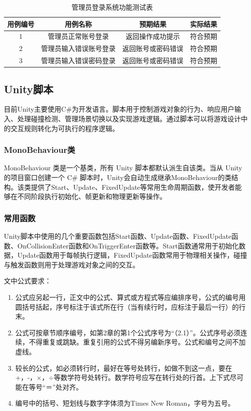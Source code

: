 \documentclass[12pt]{graduate-design-manual}
\begin{document}
\begin{table}[H]
\centering
\caption{管理员登录系统功能测试表}
\begin{tabular}{cccc}
\toprule
用例编号 & 用例名称 & 预期结果 & 实际结果 \\
\midrule
1 & 管理员正常账号登录 & 返回操作成功提示 & 符合预期 \\
2 & 管理员输入错误账号登录 & 返回账号或密码错误 & 符合预期 \\
3 & 管理员输入错误密码登录 & 返回账号或密码错误 & 符合预期 \\
\bottomrule
\end{tabular}
\end{table}

\subsection{Unity脚本}
目前Unity主要使用C\#为开发语言。脚本用于控制游戏对象的行为、响应用户输入、处理碰撞检测、管理场景切换以及实现游戏逻辑。通过脚本可以将游戏设计中的交互规则转化为可执行的程序逻辑。

\subsubsection{MonoBehaviour类}
MonoBehaviour 类是一个基类，所有 Unity 脚本都默认派生自该类。当从 Unity 的项目窗口创建一个 C\# 脚本时，Unity会自动生成继承MonoBehaviour的类结构。该类提供了Start、Update、FixedUpdate等常用生命周期函数，使开发者能够在不同阶段执行初始化、帧更新和物理更新等操作。

\subsubsection{常用函数}
Unity脚本中使用的几个重要函数包括Start函数、Update函数、FixedUpdate函数、OnCollisionEnter函数和OnTriggerEnter函数等。Start函数通常用于初始化数据，Update函数用于每帧执行逻辑，FixedUpdate函数常用于物理相关操作，碰撞与触发函数则用于处理游戏对象之间的交互。

文中公式要求：
\begin{enumerate}
    \item 公式应另起一行，正文中的公式、算式或方程式等应编排序号，公式的编号用圆括号括起，序号标注于该式所在行（当有续行时，应标注于最后一行）的行末。
    \item 公式可按章节顺序编号，如第2章的第1个公式序号为“（2.1）”。公式序号必须连续，不得重复或跳缺。重复引用的公式不得另编新序号。公式和编号之间不加虚线。
    \item 较长的公式，如必须转行时，最好在等号处转行，如做不到这一点，要在+，-，$\times$，$\div$等数学符号处转行。数学符号应写在转行处的行首。上下式尽可能在等号“＝”处对齐。
    \item 编号中的括号、短划线与数字字体须为Times New Roman，字号为五号。
\end{enumerate}
\end{document}

